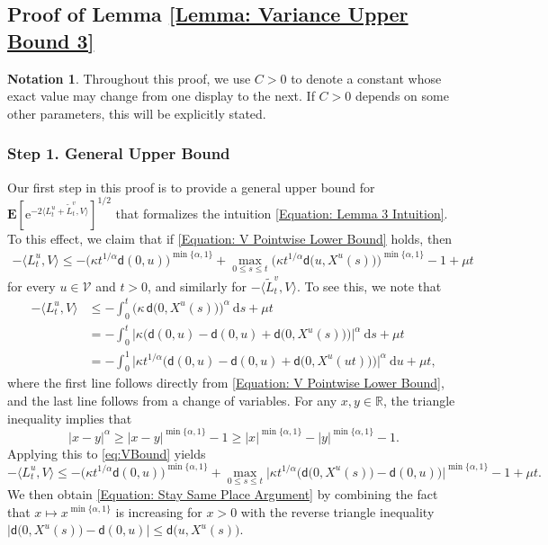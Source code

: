 \documentclass{amsart}
\numberwithin{equation}{section}
\theoremstyle{definition}
\newtheorem{notation}[theorem]{Notation}
\newcommand\al{\alpha}
\newcommand\ka{\kappa}
\renewcommand\d{~\mathrm d}
\newcommand\mbf{\mathbf}
\newcommand\mr{\mathrm}
\newcommand\ms{\mathscr}
\newcommand\msf{\mathsf}
\begin{document}
%

\subsection{Proof of Lemma \ref{Lemma: Variance Upper Bound 3}}
\label{sec:PrLem3}

%

\begin{notation}
Throughout this proof, we use $C>0$ to denote a constant
whose exact value may change from one display to the next.
If $C>0$ depends on some other parameters, this will be explicitly
stated.
\end{notation}

%

\subsubsection{Step 1. General Upper Bound}

%

Our first step in this proof is to provide a general upper bound for $\mbf E[\mr e^{-2\langle L^u_t+\tilde L^v_t,V\rangle}]^{1/2}$
that formalizes the intuition \eqref{Equation: Lemma 3 Intuition}.
To this effect, we claim that if \eqref{Equation: V Pointwise Lower Bound} holds, then
\begin{align}
\label{Equation: Stay Same Place Argument}
-\langle L^u_t,V\rangle
\leq-\big(\ka t^{1/\al}\msf d(0,u)\big)^{\min\{\al,1\}}+\max_{0\leq s\leq t}\Big(\ka t^{1/\al}\msf d\big(u,X^u(s)\big)\Big)^{\min\{\al,1\}}-1+\mu t
\end{align}
for every $u\in\ms V$ and $t>0$, and similarly for $-\langle\tilde L^v_t,V\rangle$.
To see this, we note that
\begin{align}\label{eq:VBound}
\nonumber
-\langle L^u_t,V\rangle
&\leq-\int_0^t\Big(\ka\,\msf d\big(0,X^u(s)\big)\Big)^\al\d s+\mu t\\
\nonumber
&=-\int_0^t\Big|\ka\Big(\msf d(0,u)-\msf d(0,u)+\msf d\big(0,X^u(s)\big)\Big)\Big|^\al\d s+\mu t\\
&=-\int_0^1\Big|\ka t^{1/\al}\Big(\msf d(0,u)-\msf d(0,u)+\msf d\big(0,X^u(ut)\big)\Big)\Big|^\al\d u+\mu t,
\end{align}
where the first line follows directly from \eqref{Equation: V Pointwise Lower Bound},
and the last line follows from a change of variables. For any $x,y\in \mathbb{R}$, the triangle
inequality implies that
\[|x-y|^{\al}\geq|x-y|^{\min\{\al,1\}}-1\geq|x|^{\min\{\al,1\}}-|y|^{\min\{\al,1\}}-1.\]
Applying this to \eqref{eq:VBound} yields
\[-\langle L^u_t,V\rangle\leq-\big(\ka t^{1/\al}\msf d(0,u)\big)^{\min\{\al,1\}}+\max_{0\leq s\leq t}\Big|\ka t^{1/\al}\Big(\msf d\big(0,X^u(s)\big)-\msf d(0,u)\Big)\Big|^{\min\{\al,1\}}-1+\mu t.\]
We then obtain \eqref{Equation: Stay Same Place Argument} by combining the fact that $x\mapsto x^{\min\{\al,1\}}$ is increasing for $x>0$
with the reverse triangle inequality $\big|\msf d\big(0,X^u(s)\big)-\msf d(0,u)\big|\leq\msf d\big(u,X^u(s)\big)$.
\end{document}
